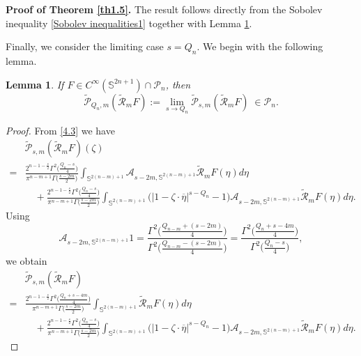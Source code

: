 \documentclass[12pt,reqno]{amsart}%
\theoremstyle{plain}
\newtheorem{lemma}{Lemma}[section]
\numberwithin{equation}{section}
\begin{document}
\textbf{Proof of Theorem \ref{th1.5}.} The result follows directly from the Sobolev inequality \eqref{Sobolev inequalities1} together with Lemma \ref{lm4.4}.

\vspace{0.2cm}


Finally, we consider the limiting case \( s = Q_n \). We begin with the following lemma.

\begin{lemma}\label{lm4.4}
If \( F \in C^{\infty}(\mathbb{S}^{2n+1}) \cap \mathcal{P}_n \), then
\[
\widetilde{\mathcal{P}}_{Q_n,m}(\widetilde{\mathcal{R}}_{m}F)
:= \lim_{s\rightarrow Q_n} \widetilde{\mathcal{P}}_{s,m}(\widetilde{\mathcal{R}}_{m}F) \; \in \mathcal{P}_n .
\]
\end{lemma}
\begin{proof}
From \eqref{4.3} we have
\begin{align*}
&\widetilde{\mathcal{P}}_{s,m}(\widetilde{\mathcal{R}}_{m}F)(\zeta) \\
=& \frac{2^{n-1-\frac{s}{2}}\Gamma^{2}\bigl(\frac{Q_n-s}{4}\bigr)}
{\pi^{n-m+1}\Gamma\bigl(\frac{s-2m}{2}\bigr)}
\int_{\mathbb{S}^{2(n-m)+1}}\mathcal{A}_{s-2m,\mathbb{S}^{2(n-m)+1}}
\widetilde{\mathcal{R}}_{m}F(\eta)d\eta \\
&\quad + \frac{2^{n-1-\frac{s}{2}}\Gamma^{2}\bigl(\frac{Q_n-s}{4}\bigr)}
{\pi^{n-m+1}\Gamma\bigl(\frac{s-2m}{2}\bigr)}
\int_{\mathbb{S}^{2(n-m)+1}}\bigl(|1-\zeta\cdot\overline{\eta}|^{s-Q_n}-1\bigr)
\mathcal{A}_{s-2m,\mathbb{S}^{2(n-m)+1}}\widetilde{\mathcal{R}}_{m}F(\eta)d\eta .
\end{align*}
Using
\[
\mathcal{A}_{s-2m,\mathbb{S}^{2(n-m)+1}}1
= \frac{\Gamma^{2}\bigl(\frac{Q_{n-m}+(s-2m)}{4}\bigr)}
{\Gamma^{2}\bigl(\frac{Q_{n-m}-(s-2m)}{4}\bigr)}
= \frac{\Gamma^{2}\bigl(\frac{Q_{n}+s-4m}{4}\bigr)}
{\Gamma^{2}\bigl(\frac{Q_{n}-s}{4}\bigr)},
\]
we obtain
\begin{align*}
&\widetilde{\mathcal{P}}_{s,m}(\widetilde{\mathcal{R}}_{m}F) \\
=& \frac{2^{n-1-\frac{s}{2}}\Gamma^{2}\bigl(\frac{Q_n+s-4m}{4}\bigr)}
{\pi^{n-m+1}\Gamma\bigl(\frac{s-2m}{2}\bigr)}
\int_{\mathbb{S}^{2(n-m)+1}}\widetilde{\mathcal{R}}_{m}F(\eta)d\eta \\
&\quad + \frac{2^{n-1-\frac{s}{2}}\Gamma^{2}\bigl(\frac{Q_n-s}{4}\bigr)}
{\pi^{n-m+1}\Gamma\bigl(\frac{s-2m}{2}\bigr)}
\int_{\mathbb{S}^{2(n-m)+1}}\bigl(|1-\zeta\cdot\overline{\eta}|^{s-Q_n}-1\bigr)
\mathcal{A}_{s-2m,\mathbb{S}^{2(n-m)+1}}\widetilde{\mathcal{R}}_{m}F(\eta)d\eta .
\end{align*}

\end{proof}
\end{document}
